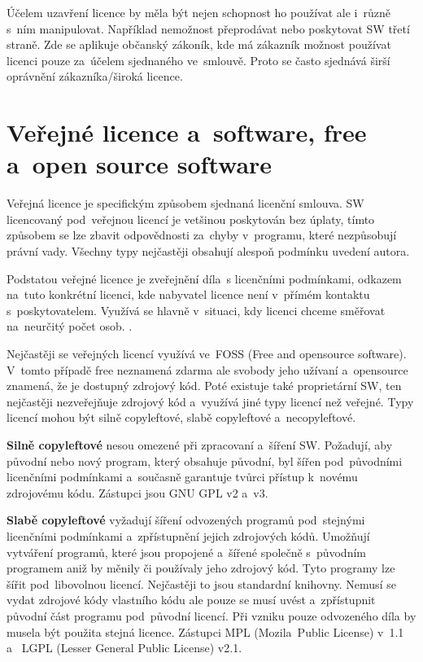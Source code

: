 Účelem uzavření licence by měla být nejen schopnost ho používat ale i~různě s~ním manipulovat. Například nemožnost přeprodávat nebo poskytovat SW třetí straně. Zde se aplikuje občanský zákoník, kde má zákazník možnost používat licenci pouze za~účelem sjednaného ve~smlouvě. Proto se často sjednává širší oprávnění zákazníka/široká licence.
\vspace{1cm}








\clearpage
\section{Veřejné licence a~software, free a~open source software}

Veřejná licence je specifickým způsobem sjednaná licenční smlouva. SW licencovaný pod~veřejnou licencí je vetšinou poskytován bez úplaty, tímto způsobem se lze zbavit odpovědnosti za~chyby v~programu, které nezpůsobují právní vady. Všechny typy nejčastěji obsahují alespoň podmínku uvedení autora.
\vspace{0.2cm}

Podstatou veřejné licence je zveřejnění díla~s licenčními podmínkami, odkazem na~tuto konkrétní licenci, kde nabyvatel licence není v~přímém kontaktu s~poskytovatelem. Využívá se hlavně v~situaci, kdy licenci chceme směřovat na~neurčitý počet osob. \emph{}.
\vspace{0.05cm}

Nejčastěji se veřejných licencí využívá ve~FOSS (Free and opensource software). V~tomto případě free neznamená zdarma ale svobody jeho užívaní a~opensource znamená, že je dostupný zdrojový kód. Poté existuje také proprietární SW, ten nejčastěji nezveřejňuje zdrojový kód a~využívá jiné typy licencí než veřejné. Typy licencí mohou být silně copyleftové, slabě copyleftové a~necopyleftové.

\textbf{Silně copyleftové} nesou omezené při zpracovaní a~šíření SW. Požadují, aby původní nebo nový program, který obsahuje původní, byl šířen pod~původními licenčními podmínkami a~současně garantuje tvůrci přístup k~novému zdrojovému kódu. Zástupci jsou GNU GPL v2 a~v3.

\textbf{Slabě copyleftové} vyžadují šíření odvozených programů pod~stejnými licenčními podmínkami a~zpřístupnění jejich zdrojových kódů. Umožňují vytváření programů, které jsou propojené a~šířené společně s~původním programem aniž by měnily či používaly jeho zdrojový kód. Tyto programy lze šířit pod~libovolnou licencí. Nejčastěji to jsou standardní knihovny. Nemusí se vydat zdrojové kódy vlastního kódu ale pouze se musí uvést a~zpřístupnit původní část programu pod~původní licencí. Při vzniku pouze odvozeného díla by musela být použita stejná licence. Zástupci MPL (Mozila~Public License) v~1.1 a~ LGPL (Lesser General Public License) v2.1.

